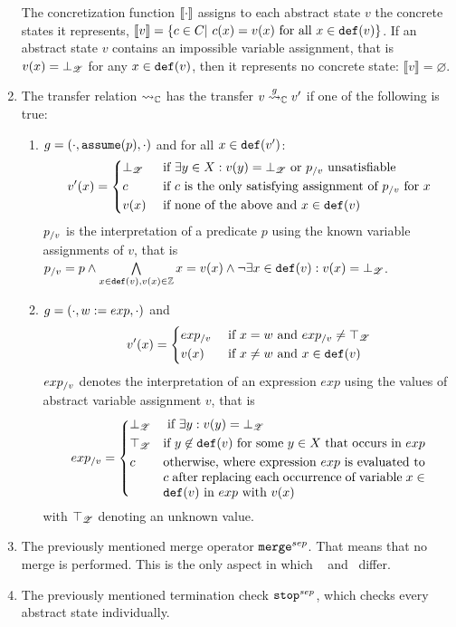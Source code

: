 \begin{enumerate}[leftmargin=*, label=\arabic*.]
	The concretization function $[\![ \cdot ]\!]$ assigns to each abstract state $v$ the concrete states it represents, $[\![ v ]\!] = \{ c \in C |\ c(x) = v(x) \text{ for all } x \in \texttt{def}(v)\}$.
	If an abstract state $v$ contains an impossible variable assignment, that is $v(x) = \bot_{\mathscr{Z}}$ for any $x \in \texttt{def}(v)$, then it represents no concrete state: $\llbracket v \rrbracket = \varnothing$.
\item The transfer relation $\rightsquigarrow_{\mathbb{C}}$ has the transfer $v \overset{g}{\rightsquigarrow}_{\mathbb{C}} v'$ if one of the following is true:
	\begin{enumerate}[label=\alph*)]
	\item $g = (\cdot, \texttt{assume}(p), \cdot)$ and for all $x \in \texttt{def}(v')$:
		\[ v'(x) = \begin{dcases}
			\bot_{\mathscr{Z}} & \text{ if } \exists y \in X : v(y) = \bot_{\mathscr{Z}} \text{ or } p_{/v} \text{ unsatisfiable}\\
			c & \text{ if $c$ is the only satisfying assignment of $p_{/v}$ for $x$}\\
			v(x) & \text{ if none of the above and } x \in \texttt{def}(v)
		\end{dcases}\]
		$p_{/v}$ is the interpretation of a predicate $p$ using the known variable assignments of $v$, that is
		$p_{/v} = p \wedge \bigwedge\limits_{x \in \texttt{def}(v), v(x) \in \mathbb{Z}}  x = v(x) \wedge \neg \exists x \in \texttt{def}(v) : v(x) = \bot_{\mathscr{Z}}$.
	\item $g = (\cdot, w := exp, \cdot)$ and
		\[ v'(x) = \begin{dcases}
			exp_{/v} & \text{ if } x = w \text{ and } exp_{/v} \neq \top_{\mathscr{Z}}\\
			v(x) & \text{ if } x \neq w \text{ and } x \in \texttt{def}(v)\\
		\end{dcases}\]
		$exp_{/v}$ denotes the interpretation of an expression $exp$ using the values of abstract variable assignment $v$, that is
		\[exp_\using{v} = \begin{dcases}
			\bot_\valueset & \text{ if } \exists y : v(y) = \bot_\valueset\\
			\top_\valueset  & \parbox[t]{.6\textwidth}{if $y \not\in \defRange(v)$ for some $y \in X$ that occurs in $exp$}\\
			c & \parbox[t]{.6\textwidth}{ otherwise, where expression $exp$ is evaluated to $c$ after replacing each occurrence of variable $x \in \defRange(v)$ in $exp$ with $v(x)$}
		\end{dcases}\]
		with $\top_{\mathscr{Z}}$ denoting an unknown value.
	\end{enumerate}
\item The previously mentioned merge operator $\texttt{merge}^{sep}$. That means that no merge is performed. This is the only aspect in which \constantpropagationCPA\ \cite{BeyerBook} and \ differ.
\item The previously mentioned termination check $\texttt{stop}^{sep}$, which checks every abstract state individually.
\end{enumerate}

